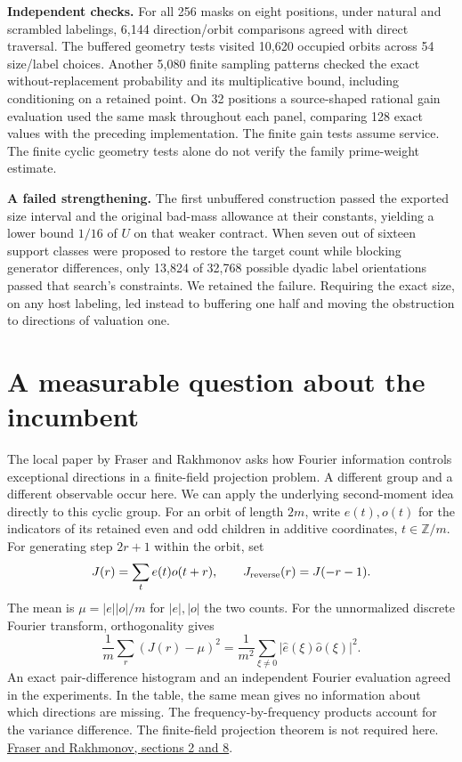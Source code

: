 \documentclass[12pt,letterpaper]{article}
\newcommand{\para}[1]{\par\medskip\noindent\textbf{#1}\quad}
\newcommand{\pagepart}[1]{\clearpage\section{#1}}
\begin{document}
\para{Independent checks.} For all 256 masks on eight positions, under natural and scrambled labelings, 6,144 direction/orbit comparisons agreed with direct traversal. The buffered geometry tests visited 10,620 occupied orbits across 54 size/label choices. Another 5,080 finite sampling patterns checked the exact without-replacement probability and its multiplicative bound, including conditioning on a retained point. On 32 positions a source-shaped rational gain evaluation used the same mask throughout each panel, comparing 128 exact values with the preceding implementation. The finite gain tests assume service. The finite cyclic geometry tests alone do not verify the family prime-weight estimate.

\para{A failed strengthening.} The first unbuffered construction passed the exported size interval and the original bad-mass allowance at their constants, yielding a lower bound \(1/16\) of \(U\) on that weaker contract. When seven out of sixteen support classes were proposed to restore the target count while blocking generator differences, only 13,824 of 32,768 possible dyadic label orientations passed that search's constraints. We retained the failure. Requiring the exact size, on any host labeling, led instead to buffering one half and moving the obstruction to directions of valuation one.

\pagepart{A measurable question about the incumbent}
The local paper by Fraser and Rakhmonov asks how Fourier information controls exceptional directions in a finite-field projection problem. A different group and a different observable occur here. We can apply the underlying second-moment idea directly to this cyclic group. For an orbit of length \(2m\), write \(e(t),o(t)\) for the indicators of its retained even and odd children in additive coordinates, \(t\in\mathbb Z/m\). For generating step \(2r+1\) within the orbit, set
\[
 J(r)=\sum_t e(t)o(t+r),\qquad J_{\rm reverse}(r)=J(-r-1).
\]
The mean is \(\mu=|e||o|/m\) for \(|e|,|o|\) the two counts. For the unnormalized discrete Fourier transform, orthogonality gives
\[
 \frac1m\sum_r(J(r)-\mu)^2
   =\frac1{m^2}\sum_{\xi\ne0}|\widehat e(\xi)\widehat o(\xi)|^2 .
\]
An exact pair-difference histogram and an independent Fourier evaluation agreed in the experiments. In the table, the same mean gives no information about which directions are missing. The frequency-by-frequency products account for the variance difference. The finite-field projection theorem is not required here. \href{https://arxiv.org/abs/2503.15072}{Fraser and Rakhmonov, sections 2 and 8}.
\end{document}
